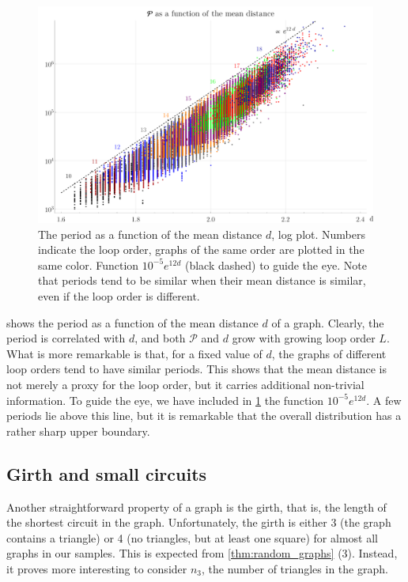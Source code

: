 \documentclass[11pt,a4paper]{article}
\newcommand{\period}{\mathcal P}
\renewcommand{\|}{\rule[-0.4ex]{0.2ex}{1.2em}}
\begin{document}
\begin{figure}[htb]
	\centering
	\includegraphics[width=.9\linewidth]{period_distance}
	\caption{The period as a function of the mean distance $d$, log plot. Numbers indicate the loop order, graphs of the same order are plotted in the same color. Function $10^{-5} e^{12  d}$ (black dashed) to guide the eye. Note that   periods  tend to be similar when their mean distance is similar, even if the loop order is different.  }
	\label{fig:period_distance}
\end{figure}

 shows the period as a function of the mean distance $d$ of a graph. Clearly, the period is correlated with $d$, and both $\period$ and $d$ grow with growing loop order $L$. What is more remarkable is that, for a fixed value of  $d$, the graphs of different loop orders tend to have similar periods. This shows that the mean distance is not merely a proxy for the loop order, but it carries additional non-trivial information.
To guide the eye, we have included in \cref{fig:period_distance} the function $10^{-5} e^{12d}$. A few periods lie above this line, but it is remarkable that the overall distribution has a rather sharp upper boundary. 


\subsection{Girth and small circuits}\label{sec:small_circuits}


Another straightforward property of a graph is the girth, that is, the length of the shortest circuit in the graph. Unfortunately, the girth is either 3 (the graph contains a triangle) or 4 (no triangles, but at least one square) for almost all graphs in our samples. This is expected from \cref{thm:random_graphs} (3). Instead, it proves more interesting to consider $n_3$, the number of triangles in the graph. 
\end{document}
